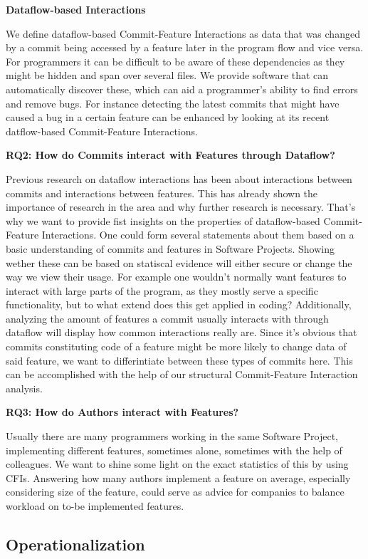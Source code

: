 \textbf{Dataflow-based Interactions} 

We define dataflow-based Commit-Feature Interactions as data that was changed by a commit being accessed by a feature later in the program flow and vice versa.
For programmers it can be difficult to be aware of these dependencies as they might be hidden and span over several files.
We provide software that can automatically discover these, which can aid a programmer's ability to find errors and remove bugs.
For instance detecting the latest commits that might have caused a bug in a certain feature can be enhanced by looking at its recent datflow-based Commit-Feature Interactions.

\textbf{RQ2: How do Commits interact with Features through Dataflow?}

Previous research on dataflow interactions has been about interactions between commits and interactions between features.
This has already shown the importance of research in the area and why further research is necessary.
That's why we want to provide fist insights on the properties of dataflow-based Commit-Feature Interactions.
One could form several statements about them based on a basic understanding of commits and features in Software Projects.
Showing wether these can be based on statiscal evidence will either secure or change the way we view their usage.
For example one wouldn't normally want features to interact with large parts of the program, as they mostly serve a specific functionality, but to what extend does this get applied in coding?
Additionally, analyzing the amount of features a commit usually interacts with through dataflow will display how common interactions really are.
Since it's obvious that commits constituting code of a feature might be more likely to change data of said feature, we want to differintiate between these types of commits here.
This can be accomplished with the help of our structural Commit-Feature Interaction analysis. 

\textbf{RQ3: How do Authors interact with Features?}

Usually there are many programmers working in the same Software Project, implementing different features, sometimes alone, sometimes with the help of colleagues.
We want to shine some light on the exact statistics of this by using CFIs.
Answering how many authors implement a feature on average, especially considering size of the feature, could serve as advice for companies to balance workload on to-be implemented features.

\subsection*{Operationalization}\label{sec:operationalization}

